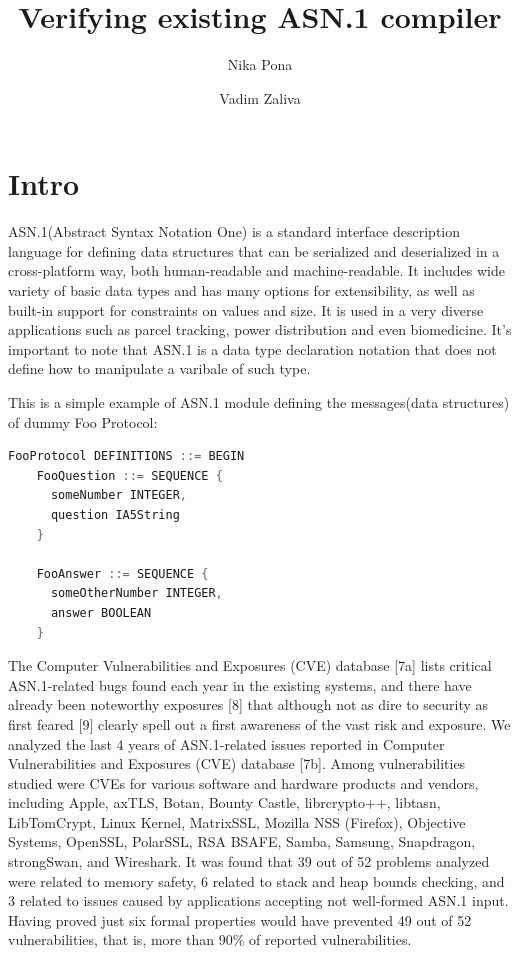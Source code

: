 \documentclass[acmsmall,nonacm]{acmart}
\begin{document}
\title{Verifying existing ASN.1 compiler}

\author{Nika Pona}
\author{Vadim Zaliva}

\begin{abstract}

\end{abstract}

\maketitle

\section{Intro}
 ASN.1(Abstract Syntax Notation One) is a standard interface description language for defining data structures that can be serialized and deserialized in a cross-platform way, both human-readable and machine-readable. It includes wide variety of basic data types and has many options for extensibility, as well as built-in support for constraints on values and size. It is used in a very diverse applications such as parcel tracking, power distribution and even biomedicine. It's important to note that ASN.1 is a data type declaration notation that does not define how to manipulate a varibale of such type.

 This is a simple example of ASN.1 module defining the messages(data structures) of dummy Foo Protocol:
 \begin{lstlisting}[language=C]
  FooProtocol DEFINITIONS ::= BEGIN
    FooQuestion ::= SEQUENCE {
      someNumber INTEGER,
      question IA5String
    }
    
    FooAnswer ::= SEQUENCE {
      someOtherNumber INTEGER,
      answer BOOLEAN
    }
  \end{lstlisting}

 The Computer Vulnerabilities and Exposures (CVE) database [7a] lists critical ASN.1-related bugs found each year in the existing systems, and there have already been noteworthy exposures [8] that although not as dire to security as first feared [9] clearly spell out a first awareness of the vast risk and exposure. We analyzed the last 4 years of ASN.1-related issues reported in Computer Vulnerabilities and Exposures (CVE) database [7b]. Among vulnerabilities studied were CVEs for various software and hardware products and vendors, including Apple, axTLS, Botan, Bounty Castle, librcrypto++, libtasn, LibTomCrypt, Linux Kernel, MatrixSSL, Mozilla NSS (Firefox), Objective Systems, OpenSSL, PolarSSL, RSA BSAFE, Samba, Samsung, Snapdragon, strongSwan, and Wireshark. It was found that 39 out of 52 problems analyzed were related to memory safety, 6 related to stack and heap bounds checking, and 3 related to issues caused by applications accepting not well-formed ASN.1 input. Having proved just six formal properties would have prevented 49 out of 52 vulnerabilities, that is, more than 90\% of reported vulnerabilities.
\end{document}
